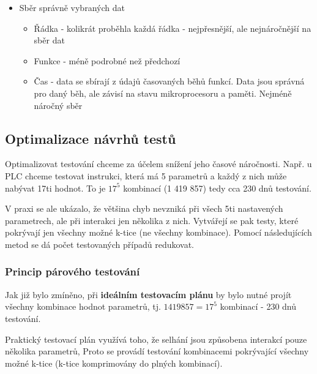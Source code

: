 \begin{itemize}[itemsep=0px]
\begin{itemize}[itemsep=0px]
\begin{itemize}[itemsep=0px]
        \item Sběr správně vybraných dat
            \begin{itemize}[itemsep=0px]
            \item Řádka - kolikrát proběhla každá řádka - nejpřesnější, ale nejnáročnější na sběr dat
            \item Funkce - méně podrobné než předchozí
            \item Čas - data se sbírají z údajů časovaných běhů funkcí. Data jsou správná pro daný běh, ale závisí na stavu mikroprocesoru a paměti. Nejméně náročný sběr
            \end{itemize}
        \end{itemize}
    \end{itemize}
\end{itemize}

\subsection{Optimalizace návrhů testů}

Optimalizovat testování chceme za účelem snížení jeho časové náročnosti. Např. u PLC chceme testovat instrukci, která má 5 parametrů a každý z nich může nabývat 17ti hodnot. To je $17^5$ kombinací (1 419 857) tedy cca 230 dnů testování.

V praxi se ale ukázalo, že většina chyb nevzniká při všech 5ti nastavených parametrech, ale při interakci jen několika z nich. Vytvářejí se pak testy, které pokrývají jen všechny možné k-tice (ne všechny kombinace). Pomocí následujících metod se dá počet testovaných případů redukovat.

\subsubsection{Princip párového testování}
Jak již bylo zmíněno, při \textbf{ideálním testovacím plánu} by bylo nutné projít všechny kombinace hodnot parametrů, tj. $1 419 857 = 17^5$ kombinací - 230 dnů testování.


Praktický testovací plán využívá toho, že selhání jsou způsobena interakcí pouze několika parametrů, Proto se provádí testování kombinacemi pokrývající všechny možné k-tice (k-tice komprimovány do plných kombinací).

